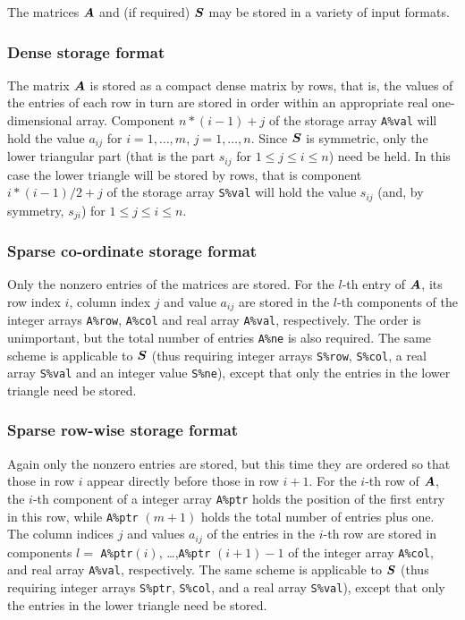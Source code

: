 \documentclass{galahad}
\begin{document}

\galmatrix
The matrices ${\bm{A}}$ and (if required) ${\bm{S}}$
may be stored in a variety of input formats.

\subsubsection{Dense storage format}\label{dense}
The matrix ${\bm{A}}$ is stored as a compact
dense matrix by rows, that is, the values of the entries of each row in turn are
stored in order within an appropriate real one-dimensional array.
Component $n \ast (i-1) + j$ of the storage array {\tt A\%val} will hold the
value $a_{ij}$ for $i = 1, \ldots , m$, $j = 1, \ldots , n$.
Since ${\bm{S}}$ is symmetric, only the lower triangular part (that is the part
$s_{ij}$ for $1 \leq j \leq i \leq n$) need be held. In this case
the lower triangle will be stored by rows, that is
component $i \ast (i-1)/2 + j$ of the storage array {\tt S\%val}
will hold the value $s_{ij}$ (and, by symmetry, $s_{ji}$)
for $1 \leq j \leq i \leq n$.

\subsubsection{Sparse co-ordinate storage format}\label{coordinate}
Only the nonzero entries of the matrices are stored. For the
$l$-th entry of ${\bm{A}}$, its row index $i$, column index $j$
and value $a_{ij}$
are stored in the $l$-th components of the integer arrays {\tt A\%row},
{\tt A\%col} and real array {\tt A\%val}, respectively.
The order is unimportant, but the total
number of entries {\tt A\%ne} is also required.
The same scheme is applicable to
${\bm{S}}$ (thus requiring integer arrays {\tt S\%row}, {\tt S\%col}, a real array
{\tt S\%val} and an integer value {\tt S\%ne}),
except that only the entries in the lower triangle need be stored.

\subsubsection{Sparse row-wise storage format}\label{rowwise}
Again only the nonzero entries are stored, but this time
they are ordered so that those in row $i$ appear directly before those
in row $i+1$. For the $i$-th row of ${\bm{A}}$, the $i$-th component of a
integer array {\tt A\%ptr} holds the position of the first entry in this row,
while {\tt A\%ptr} $(m+1)$ holds the total number of entries plus one.
The column indices $j$ and values $a_{ij}$ of the entries in the $i$-th row
are stored in components
$l =$ {\tt A\%ptr}$(i)$, \ldots ,{\tt A\%ptr} $(i+1)-1$ of the
integer array {\tt A\%col}, and real array {\tt A\%val}, respectively.
The same scheme is applicable to
${\bm{S}}$ (thus requiring integer arrays {\tt S\%ptr}, {\tt S\%col}, and
a real array {\tt S\%val}),
except that only the entries in the lower triangle need be stored.
\end{document}
